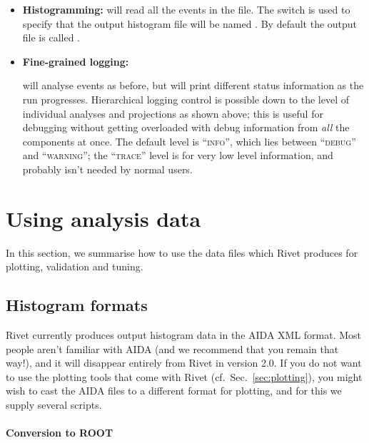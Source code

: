 \begin{itemize}
\item \textbf{Histogramming: }{ will read all the
    events in the  file. The  switch is used to
    specify that the output histogram file will be named . By
    default the output file is called .}

\item \textbf{Fine-grained logging: }

  {
    will analyse events as before, but will print different status
    information as the run progresses. Hierarchical logging control is possible
    down to the level of individual analyses and projections as shown above;
    this is useful for debugging without getting overloaded with debug
    information from \emph{all} the components at once. The default level is
    ``\textsc{info}'', which lies between ``\textsc{debug}'' and
    ``\textsc{warning}''; the ``\textsc{trace}'' level is for very low level
    information, and probably isn't needed by normal users.}

\end{itemize}



\section{Using analysis data}

In this section, we summarise how to use the data files which Rivet produces for
plotting, validation and tuning.

\subsection{Histogram formats}

Rivet currently produces output histogram data in the AIDA XML format. Most
people aren't familiar with AIDA (and we recommend that you remain that way!),
and it will disappear entirely from Rivet in version 2.0. If you do not want to
use the plotting tools that come with Rivet (cf.\ Sec.~\ref{sec:plotting}), you might
wish to cast the AIDA files to a different format for plotting, and for this we
supply several scripts.

\paragraph{Conversion to ROOT}

